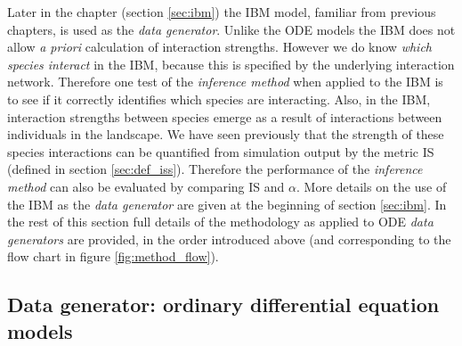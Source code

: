 Later in the chapter (section \ref{sec:ibm}) the IBM model, familiar from previous chapters, is used as the \emph{data generator}. Unlike the ODE models the IBM does not allow \emph{a priori} calculation of interaction strengths. However we do know \emph{which species interact} in the IBM, because this is specified by the underlying interaction network. Therefore one test of the \emph{inference method} when applied to the IBM is to see if it correctly identifies which species are interacting. Also, in the IBM, interaction strengths between species emerge as a result of interactions between individuals in the landscape. We have seen previously that the strength of these species interactions can be quantified from simulation output by the metric IS (defined in section \ref{sec:def_iss}). Therefore the performance of the \emph{inference method} can also be evaluated by comparing IS and $\alpha$. More details on the use of the IBM as the \emph{data generator} are given at the beginning of section \ref{sec:ibm}. In the rest of this section full details of the methodology as applied to ODE \emph{data generators} are provided, in the order introduced above (and corresponding to the flow chart in figure \ref{fig:method_flow}).


\subsection{Data generator: ordinary differential equation models}
\label{sec:models}

